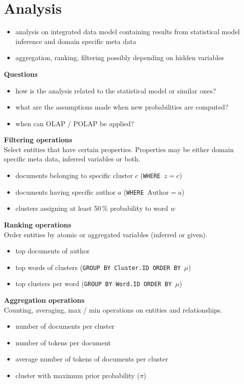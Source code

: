 \section{Analysis}

\begin{itemize}
\item analysis on integrated data model containing results from statistical model inference and domain specific meta data
\item aggregation, ranking, filtering possibly depending on hidden variables
\end{itemize}

\textbf{Questions}
\begin{itemize}
\item how is the analysis related to the statistical model or similar ones?
\item what are the assumptions made when new probabilities are computed?
\item when can OLAP / POLAP be applied?
\end{itemize}

\textbf{Filtering operations}\\
Select entities that have certain properties. Properties may be either domain specific meta data, inferred variables or both.
\begin{itemize}
\item documents belonging to specific cluster $c$ (\texttt{WHERE $z = c$})
\item documents having specific author $a$ (\texttt{WHERE $\textrm{Author} = a$})
\item clusters assigning at least 50\,\% probability to word $w$
\end{itemize}

\textbf{Ranking operations}\\
Order entities by atomic or aggregated variables (inferred or given).
\begin{itemize}
\item top documents of author
\item top words of clusters (\texttt{GROUP BY \textrm{Cluster.ID} ORDER BY $\mu$})
\item top clusters per word (\texttt{GROUP BY \textrm{Word.ID} ORDER BY $\mu$})
\end{itemize}

\textbf{Aggregation operations}\\
Counting, averaging, max / min operations on entities and relationships.
\begin{itemize}
\item number of documents per cluster
\item number of tokens per document
\item average number of tokens of documents per cluster
\item cluster with maximum prior probability ($\pi$)
\end{itemize}
